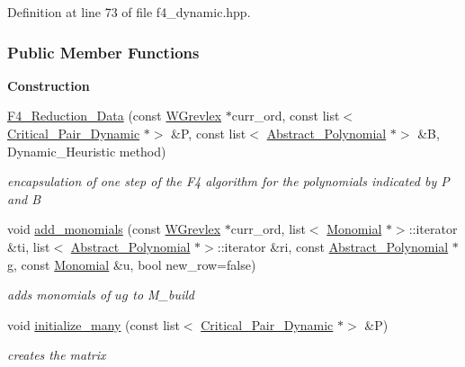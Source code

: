 Definition at line 73 of file f4\+\_\+dynamic.\+hpp.

\subsubsection*{Public Member Functions}
\begin{Indent}\textbf{ Construction}\par
\begin{DoxyCompactItemize}
\item 
\hyperlink{group___g_b_computation_a41791d20f96fc7310a40a8e4c63aa4ef}{F4\+\_\+\+Reduction\+\_\+\+Data} (const \hyperlink{group__orderinggroup_class_w_grevlex}{W\+Grevlex} $\ast$curr\+\_\+ord, const list$<$ \hyperlink{group___g_b_computation_class_critical___pair___dynamic}{Critical\+\_\+\+Pair\+\_\+\+Dynamic} $\ast$$>$ \&P, const list$<$ \hyperlink{group__polygroup_class_abstract___polynomial}{Abstract\+\_\+\+Polynomial} $\ast$$>$ \&B, Dynamic\+\_\+\+Heuristic method)
\begin{DoxyCompactList}\small\item\em encapsulation of one step of the F4 algorithm for the polynomials indicated by {\ttfamily P} and {\ttfamily B} \end{DoxyCompactList}\item 
void \hyperlink{group___g_b_computation_a2096fe45e5eecc1c855acb82787f2719}{add\+\_\+monomials} (const \hyperlink{group__orderinggroup_class_w_grevlex}{W\+Grevlex} $\ast$curr\+\_\+ord, list$<$ \hyperlink{group__polygroup_class_monomial}{Monomial} $\ast$$>$\+::iterator \&ti, list$<$ \hyperlink{group__polygroup_class_abstract___polynomial}{Abstract\+\_\+\+Polynomial} $\ast$$>$\+::iterator \&ri, const \hyperlink{group__polygroup_class_abstract___polynomial}{Abstract\+\_\+\+Polynomial} $\ast$g, const \hyperlink{group__polygroup_class_monomial}{Monomial} \&u, bool new\+\_\+row=false)
\begin{DoxyCompactList}\small\item\em adds monomials of $ ug $ to {\ttfamily M\+\_\+build} \end{DoxyCompactList}\item 
void \hyperlink{group___g_b_computation_a9fa6a212375b9498ca86a2c18e94ca1e}{initialize\+\_\+many} (const list$<$ \hyperlink{group___g_b_computation_class_critical___pair___dynamic}{Critical\+\_\+\+Pair\+\_\+\+Dynamic} $\ast$$>$ \&P)
\begin{DoxyCompactList}\small\item\em creates the matrix \end{DoxyCompactList}\item 
$$
\end{DoxyCompactItemize}
\end{Indent}
